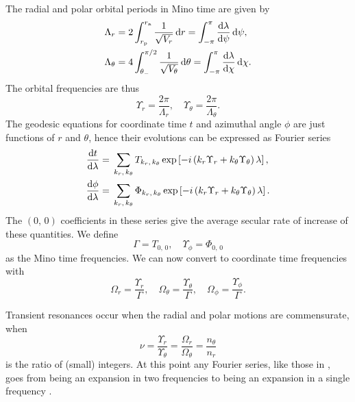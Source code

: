 The radial and polar orbital periods in Mino time are given by
\begin{subequations}
\begin{align}
\Lambda_r = {} & 2\int_{r_\mathrm{p}}^{r_\mathrm{a}}{\dfrac{1}{\sqrt{V_r}}}\,\mathrm{d}{r} = \int_{-\pi}^{\pi}{\dfrac{\mathrm{d} {\lambda}}{\mathrm{d} {\psi}}}\,\mathrm{d}{\psi}, \\
\Lambda_\theta = {} & 4\int_{\theta_-}^{\pi/2}{\dfrac{1}{\sqrt{V_\theta}}}\,\mathrm{d}{\theta} = \int_{-\pi}^{\pi}{\dfrac{\mathrm{d} {\lambda}}{\mathrm{d} {\chi}}}\,\mathrm{d}{\chi}.
\end{align}
\end{subequations}
The orbital frequencies are thus
\begin{equation}
\Upsilon_r = \dfrac{2\pi}{\Lambda_r}, \quad \Upsilon_\theta = \dfrac{2\pi}{\Lambda_\theta}.
\end{equation}
The geodesic equations for coordinate time $t$ and azimuthal angle $\phi$ are just functions of $r$ and $\theta$, hence their evolutions can be expressed as Fourier series \citep{Drasco2004}
\begin{subequations}
\begin{align}
\dfrac{\mathrm{d} {t}}{\mathrm{d} {\lambda}} = {} & \sum_{k_r,\,k_\theta}T_{k_r,\, k_\theta}\exp\left[-i\left(k_r\Upsilon_r + k_\theta\Upsilon_\theta\right)\lambda\right], \\
\dfrac{\mathrm{d} {\phi}}{\mathrm{d} {\lambda}} = {} & \sum_{k_r,\,k_\theta}\Phi_{k_r,\, k_\theta}\exp\left[-i\left(k_r\Upsilon_r + k_\theta\Upsilon_\theta\right)\lambda\right].
\end{align}
\label{eq:Mino-Fourier}
\end{subequations}
The $(0,\,0)$ coefficients in these series give the average secular rate of increase of these quantities. We define
\begin{equation}
\Gamma = T_{0,\,0}, \quad \Upsilon_\phi = \Phi_{0,\,0}
\end{equation}
as the Mino time frequencies. We can now convert to coordinate time frequencies with
\begin{equation}
\Omega_r = \dfrac{\Upsilon_r}{\Gamma}, \quad \Omega_\theta = \dfrac{\Upsilon_\theta}{\Gamma}, \quad \Omega_\phi = \dfrac{\Upsilon_\phi}{\Gamma}.
\end{equation}

Transient resonances occur when the radial and polar motions are commensurate, when
\begin{equation}
\nu = \dfrac{\Upsilon_r}{\Upsilon_\theta} = \dfrac{\Omega_r}{\Omega_\theta} = \dfrac{n_\theta}{n_r}
\end{equation}
is the ratio of (small) integers. At this point any Fourier series, like those in , goes from being an expansion in two frequencies to being an expansion in a single frequency \citep{Bosley1992}.

